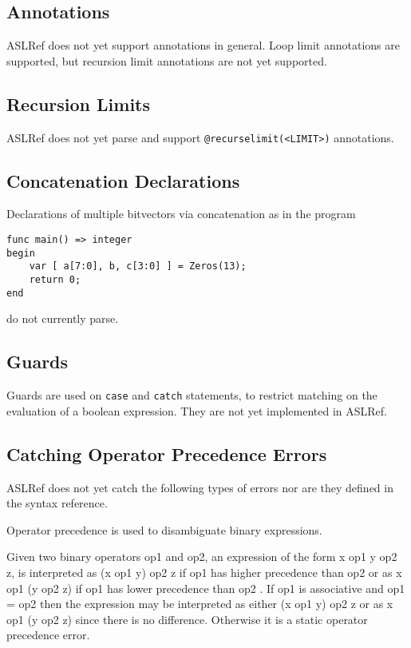 \documentclass{book}
\begin{document}

\subsection{Annotations}
ASLRef does not yet support annotations in general.
Loop limit annotations are supported, but recursion limit annotations are not yet supported.

\subsection{Recursion Limits}
ASLRef does not yet parse and support \texttt{@recurselimit(<LIMIT>)} annotations.

\subsection{Concatenation Declarations}
Declarations of multiple bitvectors via concatenation as in the program
\begin{Verbatim}
func main() => integer
begin
    var [ a[7:0], b, c[3:0] ] = Zeros(13);
    return 0;
end
\end{Verbatim}
do not currently parse.


\subsection{Guards}

Guards are used on \texttt{case} and \texttt{catch} statements, to restrict
matching on the evaluation of a boolean expression.
%
They are not yet implemented in ASLRef.


\subsection{Catching Operator Precedence Errors}
ASLRef does not yet catch the following types of errors nor are they defined in the syntax reference.

Operator precedence is used to disambiguate binary expressions.

Given two binary operators op1 and op2, an expression of the form x op1 y op2 z, is interpreted as (x op1 y) op2 z
if op1 has higher precedence than op2 or as x op1 (y op2 z) if op1 has lower precedence than op2 . If op1 is
associative and op1 = op2 then the expression may be interpreted as either (x op1 y) op2 z or as x op1 (y op2 z)
since there is no difference. Otherwise it is a static operator precedence error.
\end{document}
